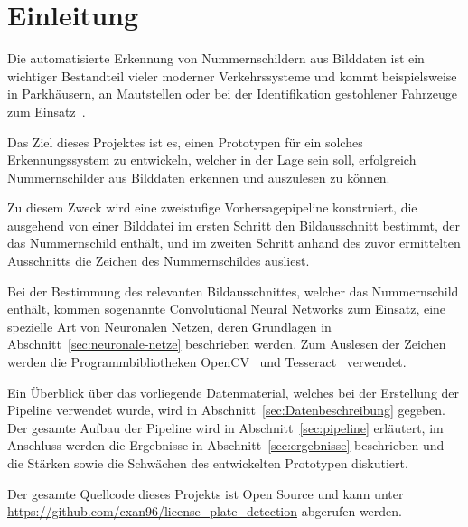 \section{Einleitung}

Die automatisierte Erkennung von Nummernschildern aus Bilddaten
ist ein wichtiger Bestandteil vieler moderner Verkehrssysteme
und kommt beispielsweise in Parkh\"ausern, an Mautstellen
oder bei der Identifikation gestohlener Fahrzeuge zum
Einsatz~\cite{silva2018a}.

Das Ziel dieses Projektes ist es, einen Prototypen f\"ur ein solches
Erkennungssystem zu entwickeln, welcher in der
Lage sein soll, erfolgreich Nummernschilder aus Bilddaten erkennen
und auszulesen zu k\"onnen.

Zu diesem Zweck wird eine zweistufige Vorhersagepipeline konstruiert,
die ausgehend von einer Bilddatei im ersten Schritt den Bildausschnitt
bestimmt, der das Nummernschild enth\"alt, und im zweiten Schritt anhand
des zuvor ermittelten
Ausschnitts die Zeichen des Nummernschildes ausliest.

Bei der Bestimmung des relevanten Bildausschnittes, welcher das Nummernschild
enth\"alt, kommen sogenannte
Convolutional Neural Networks zum Einsatz, eine spezielle Art von
Neuronalen Netzen, deren Grundlagen in Abschnitt~\ref{sec:neuronale-netze}
beschrieben werden. Zum Auslesen der Zeichen werden die
Programmbibliotheken OpenCV~\cite{opencv_library} und
Tesseract~\cite{tesseract} verwendet.

Ein \"Uberblick \"uber das vorliegende Datenmaterial, welches
bei der Erstellung der Pipeline verwendet wurde, wird in
Abschnitt~\ref{sec:Datenbeschreibung} gegeben.
Der gesamte Aufbau der Pipeline wird in Abschnitt~\ref{sec:pipeline}
erl\"autert, im Anschluss werden die Ergebnisse in Abschnitt~\ref{sec:ergebnisse}
beschrieben und die St\"arken sowie die Schw\"achen des entwickelten
Prototypen diskutiert.

Der gesamte Quellcode dieses Projekts ist Open Source und kann
unter \url{https://github.com/cxan96/license_plate_detection}
abgerufen werden.
